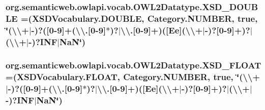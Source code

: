 \hypertarget{enumorg_1_1semanticweb_1_1owlapi_1_1vocab_1_1_o_w_l2_datatype_a80ce5bae36f5e311c088eda4bb985ece}{
\subsubsection[{X\-S\-D\-\_\-\-D\-O\-U\-B\-L\-E}]{\setlength{\rightskip}{0pt plus 5cm}org.\-semanticweb.\-owlapi.\-vocab.\-O\-W\-L2\-Datatype.\-X\-S\-D\-\_\-\-D\-O\-U\-B\-L\-E =({\bf X\-S\-D\-Vocabulary.\-D\-O\-U\-B\-L\-E}, {\bf Category.\-N\-U\-M\-B\-E\-R}, true, \char`\"{}(\textbackslash{}\textbackslash{}+$|$-\/)?(\mbox{[}0-\/9\mbox{]}+(\textbackslash{}\textbackslash{}.\mbox{[}0-\/9\mbox{]}$\ast$)?$|$\textbackslash{}\textbackslash{}.\mbox{[}0-\/9\mbox{]}+)(\mbox{[}Ee\mbox{]}(\textbackslash{}\textbackslash{}+$|$-\/)?\mbox{[}0-\/9\mbox{]}+)?$|$(\textbackslash{}\textbackslash{}+$|$-\/)?I\-N\-F$|$Na\-N\char`\"{})}}\label{enumorg_1_1semanticweb_1_1owlapi_1_1vocab_1_1_o_w_l2_datatype_a80ce5bae36f5e311c088eda4bb985ece}
\hypertarget{enumorg_1_1semanticweb_1_1owlapi_1_1vocab_1_1_o_w_l2_datatype_acc56037450b8080e2d99149db190b7fd}{
\subsubsection[{X\-S\-D\-\_\-\-F\-L\-O\-A\-T}]{\setlength{\rightskip}{0pt plus 5cm}org.\-semanticweb.\-owlapi.\-vocab.\-O\-W\-L2\-Datatype.\-X\-S\-D\-\_\-\-F\-L\-O\-A\-T =({\bf X\-S\-D\-Vocabulary.\-F\-L\-O\-A\-T}, {\bf Category.\-N\-U\-M\-B\-E\-R}, true, \char`\"{}(\textbackslash{}\textbackslash{}+$|$-\/)?(\mbox{[}0-\/9\mbox{]}+(\textbackslash{}\textbackslash{}.\mbox{[}0-\/9\mbox{]}$\ast$)?$|$\textbackslash{}\textbackslash{}.\mbox{[}0-\/9\mbox{]}+)(\mbox{[}Ee\mbox{]}(\textbackslash{}\textbackslash{}+$|$-\/)?\mbox{[}0-\/9\mbox{]}+)?$|$(\textbackslash{}\textbackslash{}+$|$-\/)?I\-N\-F$|$Na\-N\char`\"{})}}\label{enumorg_1_1semanticweb_1_1owlapi_1_1vocab_1_1_o_w_l2_datatype_acc56037450b8080e2d99149db190b7fd}
